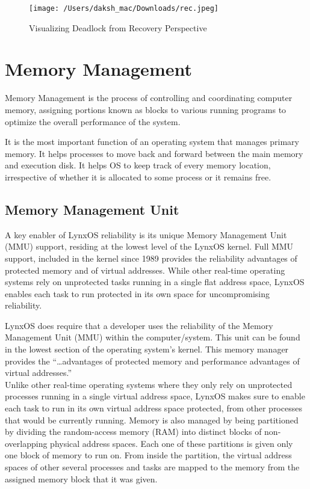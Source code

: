 \documentclass[12pt]{article}
\begin{document}
\begin{figure}[H]
	\centering
	\texttt{[image: /Users/daksh\_mac/Downloads/rec.jpeg]}
	\caption[About deadlock]{Visualizing Deadlock from Recovery Perspective}
	\label{fig:rec}	
\end{figure}
\cleardoublepage

\section{Memory Management}

Memory Management is the process of controlling and coordinating computer memory, assigning portions known as blocks to various running programs to optimize the overall performance of the system.

It is the most important function of an operating system that manages primary memory. It helps processes to move back and forward between the main memory and execution disk. It helps OS to keep track of every memory location, irrespective of whether it is allocated to some process or it remains free.

\subsection{Memory Management Unit}

A key enabler of LynxOS reliability is its unique Memory Management Unit (MMU) support, residing at the lowest level of the LynxOS kernel.
Full MMU support, included in the kernel since 1989 provides the reliability advantages of protected memory and of virtual addresses.
While other real-time operating systems rely on unprotected tasks running in
a single flat address space, LynxOS enables each task to run protected in its own space for uncompromising reliability.

 LynxOS does require that a developer uses the
reliability of the Memory Management Unit (MMU) within the computer/system. This unit can
be found in the lowest section of the operating system’s kernel. This memory manager provides
the “…advantages of protected memory and performance advantages of virtual addresses.” \cite{ref:memory}\\

Unlike other real-time operating systems where they only rely on unprotected processes running
in a single virtual address space, LynxOS makes sure to enable each task to run in its own virtual address space protected, from other processes that would be currently running. Memory is also
managed by being partitioned by dividing the random-access memory (RAM) into distinct
blocks of non-overlapping physical address spaces. Each one of these partitions is given only one
block of memory to run on. From inside the partition, the virtual address spaces of other several
processes and tasks are mapped to the memory from the assigned memory block that it was
given.\\
\end{document}
